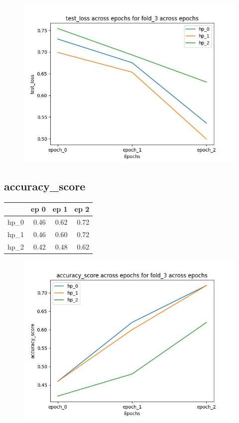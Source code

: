 \documentclass{article}
\begin{document}
\begin{figure}[H]
\includegraphics[scale = 0.75]{fold_3/test_loss}
\end{figure}
\subsection{accuracy\_score}
\begin{tabular}{lrrr}
\toprule
{} &  ep 0 &  ep 1 &  ep 2 \\
\midrule
hp\_0 &  0.46 &  0.62 &  0.72 \\
hp\_1 &  0.46 &  0.60 &  0.72 \\
hp\_2 &  0.42 &  0.48 &  0.62 \\
\bottomrule
\end{tabular}

\begin{figure}[H]
\includegraphics[scale = 0.75]{fold_3/accuracy_score}
\end{figure}
\end{document}
